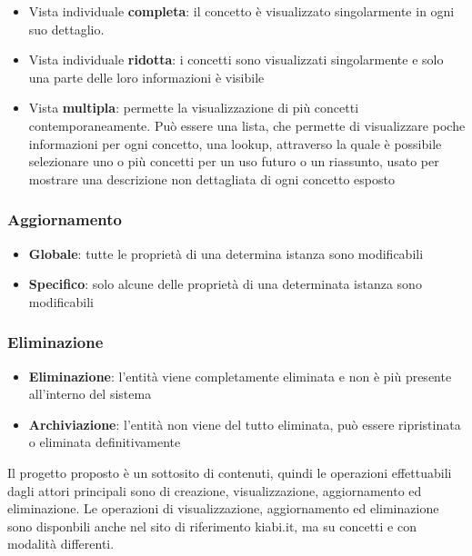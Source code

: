 \documentclass[12pt,italian,]{report}
\providecommand{\tightlist}{%
  \setlength{\itemsep}{0pt}\setlength{\parskip}{0pt}}
\begin{document}
\begin{itemize}
\tightlist
\item
  Vista individuale \textbf{completa}: il concetto è visualizzato
  singolarmente in ogni suo dettaglio.
\item
  Vista individuale \textbf{ridotta}: i concetti sono visualizzati
  singolarmente e solo una parte delle loro informazioni è visibile
\item
  Vista \textbf{multipla}: permette la visualizzazione di più concetti
  contemporaneamente. Può essere una lista, che permette di visualizzare
  poche informazioni per ogni concetto, una lookup, attraverso la quale
  è possibile selezionare uno o più concetti per un uso futuro o un
  riassunto, usato per mostrare una descrizione non dettagliata di ogni
  concetto esposto
\end{itemize}

\hypertarget{aggiornamento}{%
\subsubsection{Aggiornamento}\label{aggiornamento}}

\begin{itemize}
\tightlist
\item
  \textbf{Globale}: tutte le proprietà di una determina istanza sono
  modificabili
\item
  \textbf{Specifico}: solo alcune delle proprietà di una determinata
  istanza sono modificabili
\end{itemize}

\hypertarget{eliminazione}{%
\subsubsection{Eliminazione}\label{eliminazione}}

\begin{itemize}
\tightlist
\item
  \textbf{Eliminazione}: l'entità viene completamente eliminata e non è
  più presente all'interno del sistema
\item
  \textbf{Archiviazione}: l'entità non viene del tutto eliminata, può
  essere ripristinata o eliminata definitivamente
\end{itemize}

Il progetto proposto è un sottosito di contenuti, quindi le operazioni effettuabili dagli attori principali sono di creazione, visualizzazione, aggiornamento ed eliminazione. Le operazioni di visualizzazione, aggiornamento ed eliminazione sono disponbili anche nel sito di riferimento kiabi.it, ma su concetti e con modalità differenti.
\end{document}
